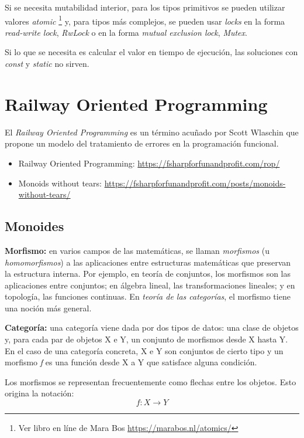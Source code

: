 Si se necesita mutabilidad interior, para los tipos primitivos se pueden utilizar valores \textit{atomic} \footnote{Ver libro en líne de Mara Bos \url{https://marabos.nl/atomics/}} y, para tipos más complejos, se pueden usar \textit{locks} en la forma \textit{read-write lock}, \textit{RwLock} o en la forma \textit{mutual exclusion lock}, \textit{Mutex}. 

Si lo que se necesita es calcular el valor en tiempo de ejecución, las soluciones con \textit{const} y \textit{static} no sirven.

\chapter{Railway Oriented Programming}

El \textit{Railway Oriented Programming} es un término acuñado por Scott Wlaschin que propone un modelo del tratamiento de errores en la programación funcional.

\begin{itemize}
   \item Railway Oriented Programming: \url{https://fsharpforfunandprofit.com/rop/}
   \item Monoids without tears: \url{https://fsharpforfunandprofit.com/posts/monoids-without-tears/}
\end{itemize}

\section{Monoides}

\textbf{Morfismo:} en varios campos de las matemáticas, se llaman \textit{morfismos} (u \textit{homomorfismos}) a las aplicaciones entre estructuras matemáticas que preservan la estructura interna. Por ejemplo, en teoría de conjuntos, los morfismos son las aplicaciones entre conjuntos; en álgebra lineal, las transformaciones lineales; y en topología, las funciones continuas. En \textit{teoría de las categorías}, el morfismo tiene una noción más general.

\textbf{Categoría:} una categoría viene dada por dos tipos de datos: una clase de objetos y, para cada par de objetos X e Y, un conjunto de morfismos desde X hasta Y. En el caso de una categoría concreta, X e Y son conjuntos de cierto tipo y un morfismo \textit{f} es una función desde X a Y que satisface alguna condición.

Los morfismos se representan frecuentemente como flechas entre los objetos. Esto origina la notación:
\begin{equation}
   f : X \rightarrow Y   
\end{equation}



